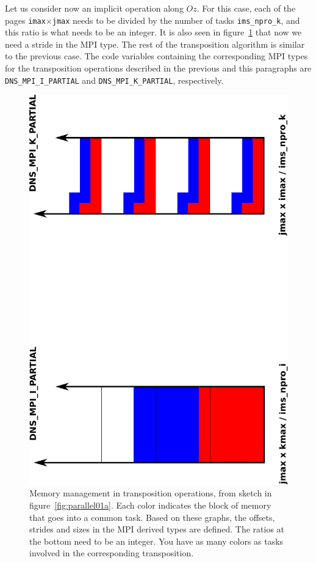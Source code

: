 Let us consider now an implicit operation along $Oz$. For this case, each of the
pages {\tt imax}$\times${\tt jmax} needs to be divided by the number of tasks
{\tt ims\_npro\_k}, and this ratio is what needs to be an integer. It is also
seen in figure~\ref{fig:parallel01b} that now we need a stride in the MPI
type. The rest of the transposition algorithm is similar to the previous
case. The code variables containing the corresponding MPI types for the
transposition operations described in the previous and this paragraphs are {\tt
DNS\_MPI\_I\_PARTIAL} and {\tt DNS\_MPI\_K\_PARTIAL}, respectively.

\begin{figure}[!ht]
\begin{centering}
\includegraphics[height=0.8\textwidth,angle=270]{figs/parallel01b}
\caption{Memory management in transposition operations, from sketch in
  figure~\ref{fig:parallel01a}. Each color indicates the block of memory that
  goes into a common task. Based on these graphs, the offsets, strides and sizes
  in the MPI derived types are defined. The ratios at the bottom need to be an
  integer. You have as many colors as tasks involved in the corresponding
  transposition.}
\label{fig:parallel01b}
\end{centering}
\end{figure}

